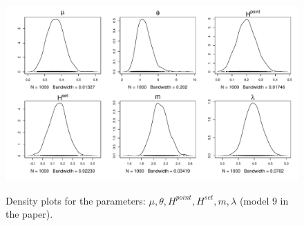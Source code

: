 \documentclass{statsoc}
\numberwithin{figure}{section}
\numberwithin{table}{section}
\begin{document}
\begin{figure}
\centering
\includegraphics[scale=0.6]{Traceplots/Densplots.pdf}\\
\caption{Density plots for the parameters: $\mu, \theta, H^{point}, H^{set}, m, \lambda$  (model 9 in the paper).}
\label{figS7}
\end{figure}
\end{document}
